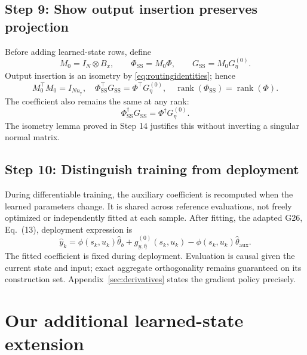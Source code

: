 \documentclass[11pt,a4paper]{article}
\newcommand{\rank}{\operatorname{rank}}
\begin{document}
\subsection*{Step 9: Show output insertion preserves projection}
Before adding learned-state rows, define
\begin{equation}\label{eq:preinsertion}
M_0=I_N\otimes B_x,\qquad \Phi_{\mathrm{SS}}=M_0\Phi,
\qquad G_{\mathrm{SS}}=M_0G_\eta^{(0)}.
\end{equation}
Output insertion is an isometry by \eqref{eq:routingidentities}; hence
\begin{equation}\label{eq:preisometry}
M_0^\top M_0=I_{Nn_{\mathrm y}},\quad
\Phi_{\mathrm{SS}}^\top G_{\mathrm{SS}}=\Phi^\top G_\eta^{(0)},\quad
\rank(\Phi_{\mathrm{SS}})=\rank(\Phi).
\end{equation}
The coefficient also remains the same at any rank:
\begin{equation}\label{eq:precoefficient}
\Phi_{\mathrm{SS}}^\dagger G_{\mathrm{SS}}=\Phi^\dagger G_\eta^{(0)}.
\end{equation}
The isometry lemma proved in Step 14 justifies this without inverting a singular normal matrix.

\subsection*{Step 10: Distinguish training from deployment}
During differentiable training, the auxiliary coefficient is recomputed when the learned parameters change. It is shared across reference evaluations, not freely optimized or independently fitted at each sample. After fitting, the adapted G26, Eq.\ (13), deployment expression is
\begin{equation}\label{eq:deploymentoriginal}
\hat y_k=\phi(s_k,u_k)\hat\theta_b
+g_{y,\hat\eta}^{(0)}(s_k,u_k)-\phi(s_k,u_k)\hat\theta_{\mathrm{aux}}.
\end{equation}
The fitted coefficient is fixed during deployment. Evaluation is causal given the current state and input; exact aggregate orthogonality remains guaranteed on its construction set. Appendix~\ref{sec:derivatives} states the gradient policy precisely.

\section{Our additional learned-state extension}
\end{document}
